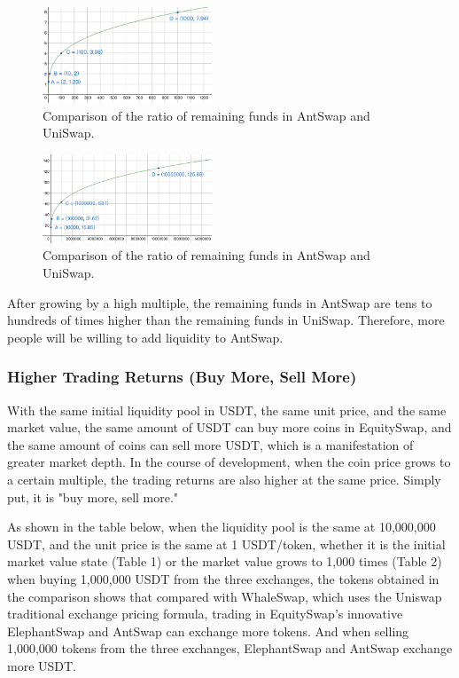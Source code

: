 \documentclass{article}
\begin{document}
\begin{figure}
\centering
\includegraphics[width=0.45\textwidth]{./img/remaining_funds_1.png}
\caption{\label{fig}Comparison of the ratio of remaining funds in AntSwap and UniSwap.}
\end{figure}
\begin{figure}
\centering
\includegraphics[width=0.45\textwidth]{./img/remaining_funds_2.png}
\caption{\label{fig}Comparison of the ratio of remaining funds in AntSwap and UniSwap.}
\end{figure}


After growing by a high multiple, the remaining funds in AntSwap are tens to hundreds of times higher than the remaining funds in UniSwap. Therefore, more people will be willing to add liquidity to AntSwap.

\subsubsection{Higher Trading Returns (Buy More, Sell More)}

With the same initial liquidity pool in USDT, the same unit price, and the same market value, the same amount of USDT can buy more coins in EquitySwap, and the same amount of coins can sell more USDT, which is a manifestation of greater market depth. In the course of development, when the coin price grows to a certain multiple, the trading returns are also higher at the same price. Simply put, it is "buy more, sell more."

As shown in the table below, when the liquidity pool is the same at 10,000,000 USDT, and the unit price is the same at 1 USDT/token, whether it is the initial market value state (Table 1) or the market value grows to 1,000 times (Table 2) when buying 1,000,000 USDT from the three exchanges, the tokens obtained in the comparison shows that compared with WhaleSwap, which uses the Uniswap traditional exchange pricing formula, trading in EquitySwap's innovative ElephantSwap and AntSwap can exchange more tokens. And when selling 1,000,000 tokens from the three exchanges, ElephantSwap and AntSwap exchange more USDT.
\end{document}
